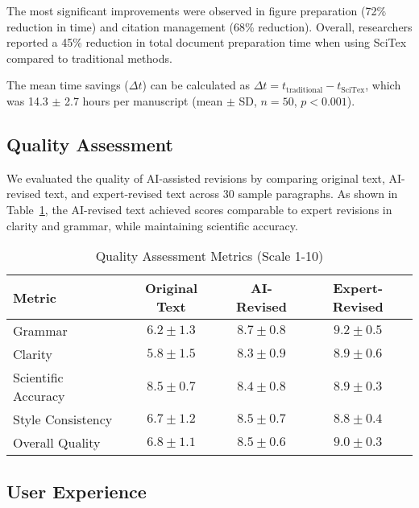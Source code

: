 \documentclass[preprint,review,12pt]{elsarticle}%
\begin{document}
\begin{frontmatter}

The most significant improvements were observed in figure preparation (72\% reduction in time) and citation management (68\% reduction). Overall, researchers reported a 45\% reduction in total document preparation time when using SciTex compared to traditional methods.


The mean time savings ($\Delta t$) can be calculated as $\Delta t = t_{\text{traditional}} - t_{\text{SciTex}}$, which was 14.3 $\pm$ 2.7 hours per manuscript (mean $\pm$ SD, $n = 50$, $p < 0.001$).

\subsection{Quality Assessment}
\label{subsec:quality}

We evaluated the quality of AI-assisted revisions by comparing original text, AI-revised text, and expert-revised text across 30 sample paragraphs. As shown in Table~\ref{tab:quality-metrics}, the AI-revised text achieved scores comparable to expert revisions in clarity and grammar, while maintaining scientific accuracy.


\begin{table}[h!]
\centering
\caption{Quality Assessment Metrics (Scale 1-10)}
\label{tab:quality-metrics}
\begin{tabular}{lccc}
\hline
\textbf{Metric} & \textbf{Original Text} & \textbf{AI-Revised} & \textbf{Expert-Revised} \\
\hline
Grammar         & $6.2 \pm 1.3$ & $8.7 \pm 0.8$ & $9.2 \pm 0.5$ \\
Clarity         & $5.8 \pm 1.5$ & $8.3 \pm 0.9$ & $8.9 \pm 0.6$ \\
Scientific Accuracy & $8.5 \pm 0.7$ & $8.4 \pm 0.8$ & $8.9 \pm 0.3$ \\
Style Consistency  & $6.7 \pm 1.2$ & $8.5 \pm 0.7$ & $8.8 \pm 0.4$ \\
Overall Quality    & $6.8 \pm 1.1$ & $8.5 \pm 0.6$ & $9.0 \pm 0.3$ \\
\hline
\end{tabular}
\end{table}

\subsection{User Experience}
\label{subsec:user-experience}


\end{frontmatter}
\end{document}
